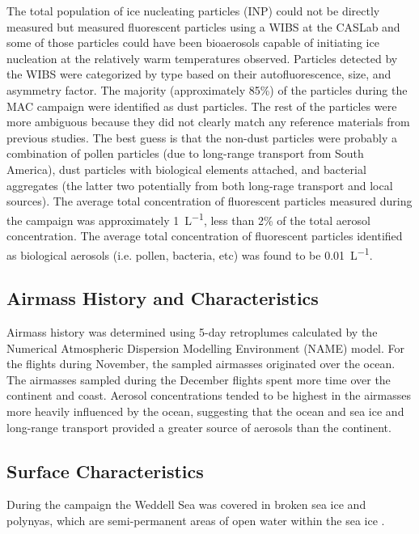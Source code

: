 The total population of ice nucleating particles (INP) could not be directly measured but \cite{craw2017} measured fluorescent particles using a WIBS at the CASLab and some of those particles could have been bioaerosols capable of initiating ice nucleation at the relatively warm temperatures observed. Particles detected by the WIBS were categorized by type based on their autofluorescence, size, and asymmetry factor. The majority (approximately 85\%) of the particles during the MAC campaign were identified as dust particles. The rest of the particles were more ambiguous because they did not clearly match any reference materials from previous studies. The best guess is that the non-dust particles were probably a combination of pollen particles (due to long-range transport from South America), dust particles with biological elements attached, and bacterial aggregates (the latter two potentially from both long-rage transport and local sources). The average total concentration of fluorescent particles measured during the campaign was approximately \SI{1}{L^{-1}}, less than 2\% of the total aerosol concentration. The average total concentration of fluorescent particles identified as biological aerosols (i.e. pollen, bacteria, etc) was found to be \SI{0.01}{L^{-1}}. \citep{craw2017,oshea2017} 
\newline
\subsection{Airmass History and Characteristics} \label{sec:airmass}
Airmass history was determined using 5-day retroplumes calculated by the Numerical Atmospheric Dispersion Modelling Environment (NAME) model. For the flights during November, the sampled airmasses originated over the ocean. The airmasses sampled during the December flights spent more time over the continent and coast. Aerosol concentrations tended to be highest in the airmasses more heavily influenced by the ocean, suggesting that the ocean and sea ice and long-range transport provided a greater source of aerosols than the continent. \citep{oshea2017}

\subsection{Surface Characteristics}
During the campaign the Weddell Sea was covered in broken sea ice and polynyas, which are semi-permanent areas of open water within the sea ice \citep{oshea2017}.

